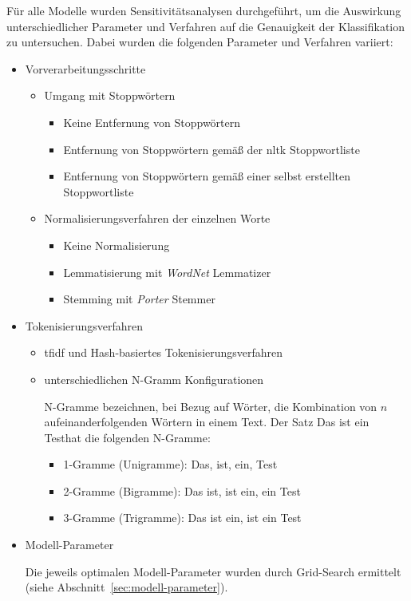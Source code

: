 Für alle Modelle wurden Sensitivitätsanalysen durchgeführt, um die Auswirkung unterschiedlicher Parameter und Verfahren auf die Genauigkeit der Klassifikation zu untersuchen.
Dabei wurden die folgenden Parameter und Verfahren variiert:
\begin{itemize}
    \item Vorverarbeitungsschritte
    \begin{itemize}
        \item Umgang mit Stoppwörtern
        \begin{itemize}
            \item Keine Entfernung von Stoppwörtern
            \item Entfernung von Stoppwörtern gemäß der \gls{nltk} Stoppwortliste
            \item Entfernung von Stoppwörtern gemäß einer selbst erstellten Stoppwortliste
        \end{itemize}
        \item Normalisierungsverfahren der einzelnen Worte
        \begin{itemize}
            \item Keine Normalisierung
            \item Lemmatisierung mit \textit{WordNet} Lemmatizer
            \item Stemming mit \textit{Porter} Stemmer
        \end{itemize}
    \end{itemize}
    \item Tokenisierungsverfahren
    \begin{itemize}
        \item \gls{tfidf} und Hash-basiertes Tokenisierungsverfahren
        \item unterschiedlichen N-Gramm Konfigurationen

        N-Gramme bezeichnen, bei Bezug auf Wörter, die Kombination von $n$ aufeinanderfolgenden Wörtern in einem Text.
        Der Satz \glqq Das ist ein Test\grqq  hat die folgenden N-Gramme:
        \begin{itemize}
            \item 1-Gramme (Unigramme): \glqq Das\grqq, \glqq ist\grqq, \glqq ein\grqq, \glqq Test\grqq
            \item 2-Gramme (Bigramme): \glqq Das ist\grqq, \glqq ist ein\grqq, \glqq ein Test\grqq
            \item 3-Gramme (Trigramme): \glqq Das ist ein\grqq, \glqq ist ein Test\grqq
        \end{itemize}
    \end{itemize}
    \item Modell-Parameter

    Die jeweils optimalen Modell-Parameter wurden durch Grid-Search ermittelt (siehe Abschnitt~\ref{sec:modell-parameter}).
\end{itemize}

